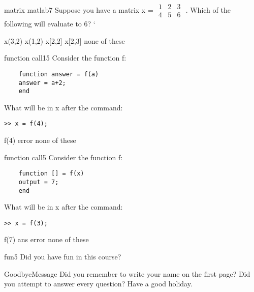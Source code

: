 \documentclass{exam}
\begin{document}
\begin{problem}[requires=matrix matlab]{matrix matlab}{7}
  Suppose you have a matrix x = \footnotesize
  $\begin{array}{ccc}1 & 2 & 3 \\4 & 5 & 6 \end{array}$
  \normalsize. Which of the following will evaluate to 6?
`  \begin{answers}   
    \answer x(3,2)
    \answer x(1,2)
    \answer x[2,2]
    \answer x[2,3] 
     none of these %
  \end{answers}
\end{problem}

\begin{problem}{function call}{15}
  Consider the function f:
  \begin{verbatim}
    function answer = f(a)
    answer = a+2;
    end
  \end{verbatim}
  What will be in x after the command:
  \begin{verbatim}>> x = f(4);
  \end{verbatim}
  \begin{answers}
    \answer f(4)
    \answer[fixed] error %
    \answer[fixed] none of these %
  \end{answers}
\end{problem}

\begin{problem}{function call}{5}
  Consider the function f:
  \begin{verbatim}
    function [] = f(x)
    output = 7;
    end
  \end{verbatim}
  What will be in x after the command:
  \begin{verbatim}>> x = f(3);\end{verbatim}
  \begin{answers}
    \answer f(7)
    \answer ans
     error %
    \answer[fixed] none of these %
  \end{answers}
\end{problem}

\begin{problem}{fun}{5}
Did you have fun in this course?


\end{problem}

\begin{block}{GoodbyeMessage}
  Did you remember to write your name on the first page?  Did you
  attempt to answer every question?    Have a good holiday.
\end{block}
\end{document}
